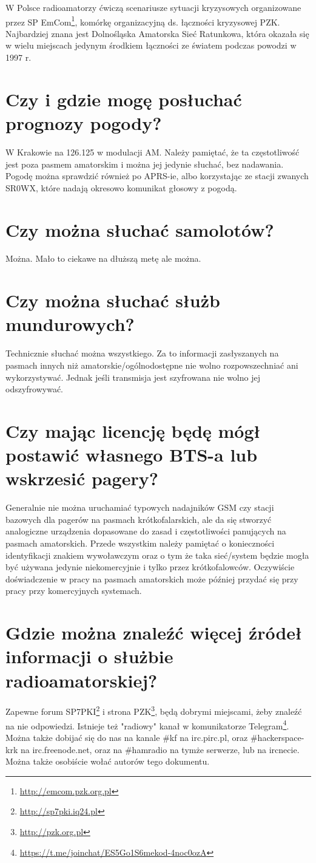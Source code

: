 \documentclass[a4paper,12pt]{article}
\begin{document}
W Polsce radioamatorzy ćwiczą scenariusze sytuacji kryzysowych organizowane przez SP EmCom\footnote{\url{http://emcom.pzk.org.pl}}, komórkę organizacyjną ds. łączności kryzysowej PZK. Najbardziej znana jest Dolnośląska Amatorska Sieć Ratunkowa, która okazała się w wielu miejscach jedynym środkiem łączności ze 
światem podczas powodzi w 1997 r.

\section{Czy i gdzie mogę posłuchać prognozy pogody?}
W Krakowie na 126.125 w modulacji AM. Należy pamiętać, że ta częstotliwość jest poza pasmem amatorskim i można jej jedynie słuchać, bez nadawania.
Pogodę można sprawdzić również po APRS-ie, albo korzystając ze stacji zwanych SR0WX, które nadają okresowo komunikat głosowy z pogodą.

\section{Czy można słuchać samolotów?}
Można. Mało to ciekawe na dłuższą metę ale można.

\section{Czy można słuchać służb mundurowych?}
Technicznie słuchać można wszystkiego. Za to informacji zasłyszanych na pasmach innych niż amatorskie/ogólnodostępne nie wolno rozpowszechniać ani wykorzystywać. Jednak jeśli transmisja jest szyfrowana nie wolno jej odszyfrowywać.

\section{Czy mając licencję będę mógł postawić własnego BTS-a lub wskrzesić pagery?}
Generalnie nie można uruchamiać typowych nadajników GSM czy stacji bazowych dla pagerów na pasmach krótkofalarskich, ale da się stworzyć analogiczne urządzenia dopasowane do zasad i częstotliwości panujących na pasmach amatorskich. Przede wszystkim należy pamiętać o konieczności identyfikacji znakiem wywoławczym oraz o tym że taka sieć/system będzie mogła być używana jedynie niekomercyjnie i tylko przez krótkofalowców. Oczywiście doświadczenie w pracy na pasmach amatorskich może później przydać się przy pracy przy komercyjnych systemach.

\section{Gdzie można znaleźć więcej źródeł informacji o służbie radioamatorskiej?}
Zapewne forum SP7PKI\footnote{\url{http://sp7pki.iq24.pl}} i strona PZK\footnote{\url{http://pzk.org.pl}}, będą dobrymi miejscami, żeby znaleźć na nie odpowiedzi. Istnieje też "radiowy" kanał w komunikatorze Telegram\footnote{\url{https://t.me/joinchat/ES5Go1S6mekod-4noc0ozA}}. Można także dobijać się do nas na kanale \#kf na irc.pirc.pl, oraz \#hackerspace-krk na irc.freenode.net, oraz na \#hamradio na tymże serwerze, lub na ircnecie. Można także osobiście wołać autorów tego dokumentu.
\end{document}

